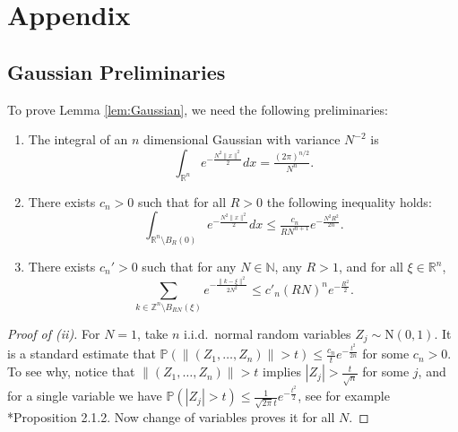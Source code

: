 \documentclass[11pt,letterpaper]{amsart}
\theoremstyle{definition}
\theoremstyle{plain}
\newcommand{\R}{{\mathbb R}}
\newcommand{\N}{{\mathbb N}}
\newcommand{\Z}{{\mathbb Z}}
\begin{document}
\section{Appendix}


\subsection{Gaussian Preliminaries}
To prove Lemma \ref{lem:Gaussian}, we need the following preliminaries:
\begin{enumerate}
    \item[(i)] The integral of an $n$ dimensional Gaussian with variance $N^{-2}$ is  
\begin{equation}\label{eq: gauss int}
    \int_{\R^n}e^{-\tfrac{N^2\|x\|^2}{2}}dx=\tfrac{(2\pi)^{n/2}}{N^n}.
\end{equation}
\item[(ii)] There exists $c_n>0$ such that for all $R>0$ the following inequality holds:
\begin{equation}\label{eq: gauss tail}
 \int_{\R^n\setminus B_{R}(0)}e^{-\tfrac{N^2\|x\|^2}{2}}dx\le
\tfrac{c_{n}}{RN^{n+1}} e^{-\tfrac{N^2R^2}{2n}}.
\end{equation}
\item[(iii)] 
There exists $c_n'>0$ such that for any $N\in\N$, any $R>1$, and for all $\xi\in\R^n$,
\begin{equation}\label{eq: disc gauss tail}
    \sum_{k\in\Z^n\setminus B_{RN}(\xi)}e^{-\tfrac{\|k-\xi\|^2}{2N^2}}\leq c'_n (RN)^ne^{-\frac{R^2}{2}}.
\end{equation}
\end{enumerate}
\begin{proof}[Proof of (ii)]
    For $N=1$, take $n$ i.i.d.~normal random variables $Z_{j}\sim \mathrm{N}(0,1)$. It is a standard estimate that  
$\mathbb{P}(\|(Z_{1},\ldots,Z_{n})\|>t)\le \frac{c_{n}}{t}e^{-\frac{t^2}{2n}}$ for some $c_{n}>0$. To see why, notice that $\|(Z_{1},\ldots,Z_{n})\|>t$ implies $|Z_{j}|>\frac{t}{\sqrt{n}}$ for some $j$, and for a single variable we have $\mathbb{P}(|Z_{j}|>t)\le \frac{1}{\sqrt{2\pi}t}e^{-\frac{t^2}{2}} $, see for example \cite{vershynin2018high}*{Proposition 2.1.2}. Now change of variables proves it for all $N$.
\end{proof}
\end{document}
